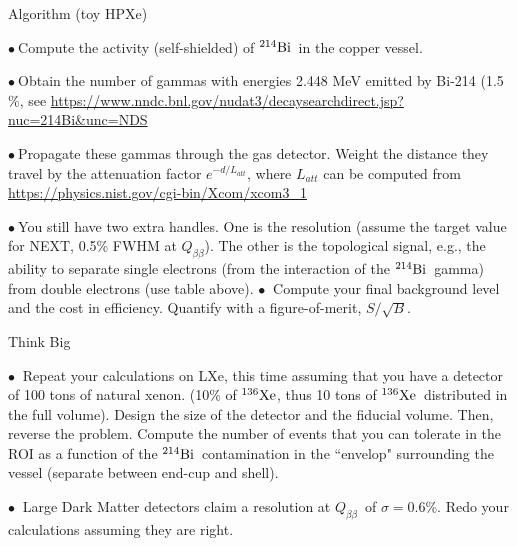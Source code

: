 \documentclass [aspectratio=169]{beamer}
\newcommand{\qbb}{\ensuremath{Q_{\beta\beta}}}
\newcommand{\XE}{\ensuremath{{}^{136}{\rm Xe}}}
\newcommand{\BI}{\ensuremath{{}^{214}{\rm Bi}}}
\begin{document}
\begin{frame}{Algorithm (toy HPXe)}

$\bullet~$Compute the activity (self-shielded) of \BI\ in the copper vessel.

$\bullet~$Obtain the number of gammas with energies 2.448 MeV emitted by Bi-214 (1.5 \%, see \url{https://www.nndc.bnl.gov/nudat3/decaysearchdirect.jsp?nuc=214Bi\&unc=NDS}

$\bullet~$Propagate these gammas through the gas detector. Weight the distance they travel by the attenuation factor $e^{-d/L_{att}}$, where $L_{att}$ can be computed from  \url{https://physics.nist.gov/cgi-bin/Xcom/xcom3_1}

$\bullet~$You still have two extra handles. One is the resolution (assume the target value for NEXT, 0.5\% FWHM at \qbb). The other is the topological signal, e.g., the ability to separate single electrons (from the interaction of the \BI\ gamma) from double electrons (use table above). 
$\bullet~$ Compute your final background level and the cost in efficiency. 
Quantify with a figure-of-merit, $S/\sqrt{B}$.
\end{frame}

\begin{frame}{Think Big}

$\bullet~$ Repeat your calculations on LXe, this time assuming that you have a detector of 100 tons of natural xenon. (10\% of \XE, thus 10 tons of \XE\ distributed in the full volume). Design the size of the detector and the fiducial volume. Then, reverse the problem. Compute the number of events that you can tolerate in the ROI as a function of the \BI\ contamination in the ``envelop" surrounding the vessel (separate between end-cup and shell). 

$\bullet~$ Large Dark Matter detectors claim a resolution at \qbb\ of $\sigma = 0.6$\%. Redo your calculations assuming they are right. 

\end{frame}
\end{document}
